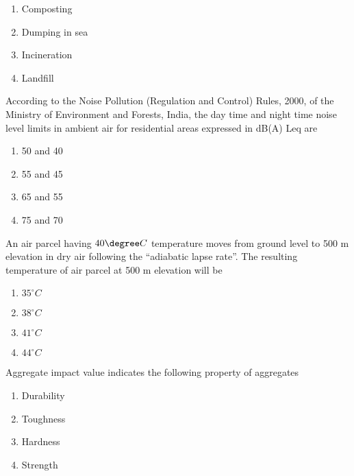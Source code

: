     \begin{multicols}{4}
        \begin{enumerate}
            \item Composting
            \item Dumping in sea
            \item Incineration
            \item Landfill
        \end{enumerate}
    \end{multicols}

\item According to the Noise Pollution (Regulation and Control) Rules, 2000,
of the Ministry of Environment and Forests, India, the day time and night time
noise level limits in ambient air for residential areas expressed in dB(A) Leq are
    \begin{multicols}{4}
        \begin{enumerate}
            \item 50 and 40
            \item 55 and 45
            \item 65 and 55
            \item 75 and 70
        \end{enumerate}
    \end{multicols}

    \item An air parcel having $40\degree C$ temperature moves from ground level to
    500 m elevation in dry air following the ``adiabatic lapse rate''. The resulting  
    temperature of air parcel at 500 m elevation will be
    \begin{multicols}{4}
        \begin{enumerate}
            \item $35^{\circ}C$
            \item $38^{\circ}C$
            \item $41^{\circ}C$
            \item $44^{\circ}C$
        \end{enumerate}
    \end{multicols}

\item Aggregate impact value indicates the following property of aggregates
    \begin{multicols}{4}
        \begin{enumerate}
            \item Durability
            \item Toughness
            \item Hardness
            \item Strength
        \end{enumerate}
    \end{multicols}

